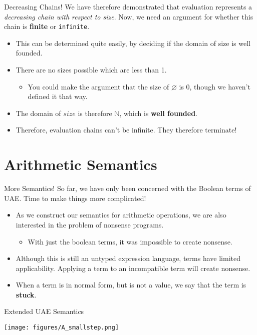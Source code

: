 \documentclass[11pt]{beamer}
\begin{document}
\begin{frame}[fragile=singleslide]{Decreasing Chains!}
We have therefore demonstrated that evaluation represents a \emph{decreasing chain with respect to size}.  Now, we need an argument for whether this chain is \textbf{finite} or \texttt{infinite}.
\begin{itemize}
\item This can be determined quite easily, by deciding if the domain of size is well founded.  
\item There are no sizes possible which are less than 1.  
\begin{itemize}
\item You could make the argument that the size of $\varnothing$ is 0, though we haven't defined it that way.
\end{itemize}
\item The domain of $size$ is therefore $\mathbb{N}$, which is \textbf{well founded}.
\item Therefore, evaluation chains can't be infinite.  They therefore terminate! 
\end{itemize}
\end{frame}

\section[Arithmetic]{Arithmetic Semantics}
\begin{frame}[fragile=singleslide]{More Semantics!}
So far, we have only been concerned with the Boolean terms of UAE.  Time to make things more complicated!
\begin{itemize}
\item As we construct our semantics for arithmetic operations, we are also interested in the problem of nonsense programs.  
\begin{itemize}
\item With just the boolean terms, it was impossible to create nonsense.
\end{itemize}
\item Although this is still an untyped expression language, terms have limited applicability.  Applying a term to an incompatible term will create nonsense.
\item When a term is in normal form, but is not a value, we say that the term is \textbf{stuck}.  
\end{itemize}
\end{frame}

\begin{frame}[fragile=singleslide]{Extended UAE Semantics}
\begin{center}
\texttt{[image: figures/A\_smallstep.png]}
\end{center}
\end{frame}
\end{document}

